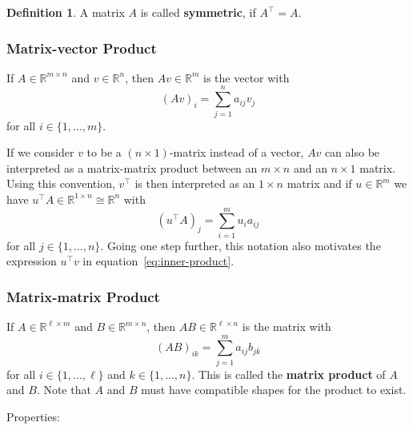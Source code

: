 \documentclass[
  a4paper,
]{article}
\theoremstyle{definition}
\newtheorem{definition}{Definition}[section]
\theoremstyle{definition}
\theoremstyle{definition}
\theoremstyle{definition}
\theoremstyle{remark}
\begin{document}
\begin{definition}
A matrix \(A\) is called \textbf{symmetric}, if \(A^\top = A\).
\end{definition}

\subsubsection{Matrix-vector Product}\label{matrix-vector-product}

If \(A \in \mathbb{R}^{m \times n}\) and \(v \in \mathbb{R}^n\), then
\(Av \in \mathbb{R}^m\) is the vector with
\begin{equation*}
  (Av)_i
  = \sum_{j=1}^n a_{ij} v_j
\end{equation*}
for all \(i \in \{1, \ldots, m\}\).

If we consider \(v\) to be a \((n\times 1)\)-matrix instead of a vector,
\(Av\) can also be interpreted as a matrix-matrix product between an \(m
\times n\) and an \(n\times 1\) matrix. Using this convention, \(v^\top\)
is then interpreted as an \(1 \times n\) matrix and if \(u\in\mathbb{R}^m\) we
have \(u^\top A \in \mathbb{R}^{1 \times n} \cong \mathbb{R}^n\) with
\begin{equation*}
  (u^\top A)_j
  = \sum_{i=1}^m u_i a_{ij}
\end{equation*}
for all \(j \in \{1, \ldots, n\}\). Going one step further, this
notation also motivates the expression \(u^\top v\) in
equation~\eqref{eq:inner-product}.

\subsubsection{Matrix-matrix Product}\label{matrix-matrix-product}

If \(A \in \mathbb{R}^{\ell \times m}\) and \(B \in \mathbb{R}^{m\times n}\), then
\(AB \in \mathbb{R}^{\ell \times n}\) is the matrix with
\begin{equation*}
  (AB)_{ik}
  = \sum_{j=1}^m a_{ij} b_{jk}
\end{equation*}
for all \(i \in \{1, \ldots, \ell\}\) and \(k \in \{1, \ldots, n\}\).
This is called the \textbf{matrix product} of \(A\) and \(B\). Note
that \(A\) and \(B\) must have compatible shapes for the product to exist.

Properties:
\end{document}
